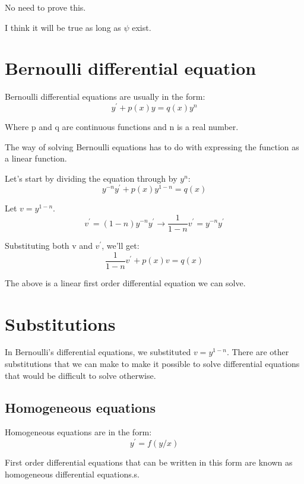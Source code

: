 \documentclass{book}
\begin{document}
No need to prove this.

I think it will be true as long as \(\psi\) exist.

\section{Bernoulli differential equation}
Bernoulli differential equations are usually in the form:
\[y^' + p(x) y = q(x) y^n\]

Where p and q are continuous functions and n is a real number.

The way of solving Bernoulli equations has to do with expressing the function as a linear function.

Let's start by dividing the equation through by \(y^n\):
\[y^{-n} y^' + p(x) y^{1 - n} = q(x)\]

Let \(v = y^{1 - n}\).
\[v^' = (1 - n)y^{-n} y^' \rightarrow \frac{1}{1 - n} v^' = y^{-n} y^'\]

Substituting both v and \(v^'\), we'll get:
\[\frac{1}{1 - n} v^' + p(x)v = q(x)\]

The above is a linear first order differential equation we can solve.

\section{Substitutions}
In Bernoulli's differential equations, we substituted \(v = y^{1-n}\). There are other substitutions that we can make to  make it possible to solve differential equations that would be difficult to solve otherwise.

\subsection{Homogeneous equations}
Homogeneous equations are in the form:
\[y^' = f(y/x)\]

First order differential equations that can be written in this form are known as homogeneous differential equations.s.
\end{document}
